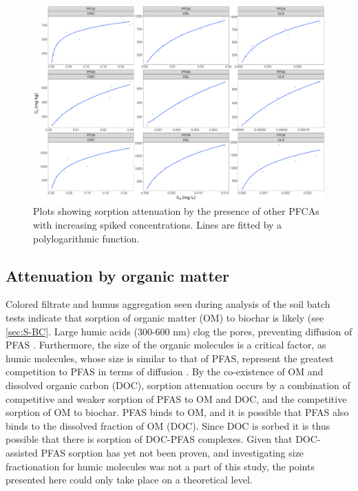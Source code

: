 \begin{figure}
    \centering
    \includegraphics[width=\textwidth]{R/figs/BC_single_attenuation.pdf}
    \caption{Plots showing sorption attenuation by the presence of other PFCAs with increasing spiked concentrations. Lines are fitted by a polylogarithmic function.}
    \label{fig:nonlinear_OND} 
\end{figure}

\subsection{Attenuation by organic matter} 
Colored filtrate and humus aggregation seen during analysis of the soil batch tests indicate that sorption of organic matter (OM) to biochar is likely (see \cref{sec:S-BC}. Large humic acids (300-600 nm) clog the pores, preventing diffusion of PFAS \citep{Cornelissen2006,kluvcakova2018size}. Furthermore, the size of the organic molecules is a critical factor, as humic molecules, whose size is similar to that of PFAS, represent the greatest competition to PFAS in terms of diffusion \citep{du2014adsorption}. By the co-existence of OM and dissolved organic carbon (DOC), sorption attenuation occurs by a combination of competitive and weaker sorption of PFAS to OM and DOC, and the competitive sorption of OM to biochar. PFAS binds to OM, and it is possible that PFAS also binds to the dissolved fraction of OM (DOC). Since DOC is sorbed it is thus possible that there is sorption of DOC-PFAS complexes. Given that DOC-assisted PFAS sorption has yet not been proven, and investigating size fractionation for humic molecules was not a part of this study, the points presented here could only take place on a theoretical level.




